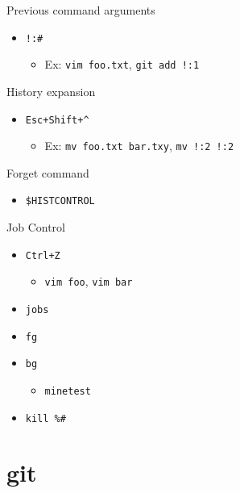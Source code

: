 \documentclass{beamer}
\begin{document}
\begin{frame}[fragile]{Previous command arguments}
\begin{itemize}
	\item \verb|!:#|
	\begin{itemize}
		\item Ex: \texttt{vim foo.txt}, \texttt{git add !:1}
	\end{itemize}
\end{itemize}
\end{frame}

\begin{frame}[fragile]{History expansion}
\begin{itemize}
	\item \verb|Esc+Shift+^|
	\begin{itemize}
		\item Ex: \texttt{mv foo.txt bar.txy}, \texttt{mv !:2 !:2}
	\end{itemize}
\end{itemize}
\end{frame}

\begin{frame}[fragile]{Forget command}
\begin{itemize}
	\item \verb|$HISTCONTROL|
\end{itemize}
\end{frame}

\begin{frame}[fragile]{Job Control}
\begin{itemize}
	\item \texttt{Ctrl+Z}
	\begin{itemize}
		\item \texttt{vim foo}, \texttt{vim bar}
	\end{itemize}
	\item \texttt{jobs}
	\item \texttt{fg}
	\item \texttt{bg}
	\begin{itemize}
		\item \texttt{minetest}
	\end{itemize}
	\item \verb|kill %#|
\end{itemize}
\end{frame}

\section{git}
\end{document}
